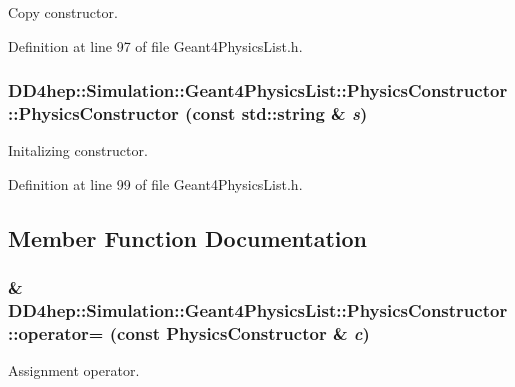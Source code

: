Copy constructor. 

Definition at line 97 of file Geant4PhysicsList.h.\hypertarget{class_d_d4hep_1_1_simulation_1_1_geant4_physics_list_1_1_physics_constructor_a38411ded2599196e9a79aa2abb72cc66}{
\subsubsection[{PhysicsConstructor}]{\setlength{\rightskip}{0pt plus 5cm}DD4hep::Simulation::Geant4PhysicsList::PhysicsConstructor::PhysicsConstructor (const std::string \& {\em s})}}
\label{class_d_d4hep_1_1_simulation_1_1_geant4_physics_list_1_1_physics_constructor_a38411ded2599196e9a79aa2abb72cc66}


Initalizing constructor. 

Definition at line 99 of file Geant4PhysicsList.h.

\subsection{Member Function Documentation}
\hypertarget{class_d_d4hep_1_1_simulation_1_1_geant4_physics_list_1_1_physics_constructor_a05c1b02c48b71ab46e1cbe56f059f9b7}{
\subsubsection[{operator=}]{\& DD4hep::Simulation::Geant4PhysicsList::PhysicsConstructor::operator= (const {\bf PhysicsConstructor} \& {\em c})}}
\label{class_d_d4hep_1_1_simulation_1_1_geant4_physics_list_1_1_physics_constructor_a05c1b02c48b71ab46e1cbe56f059f9b7}


Assignment operator. 

